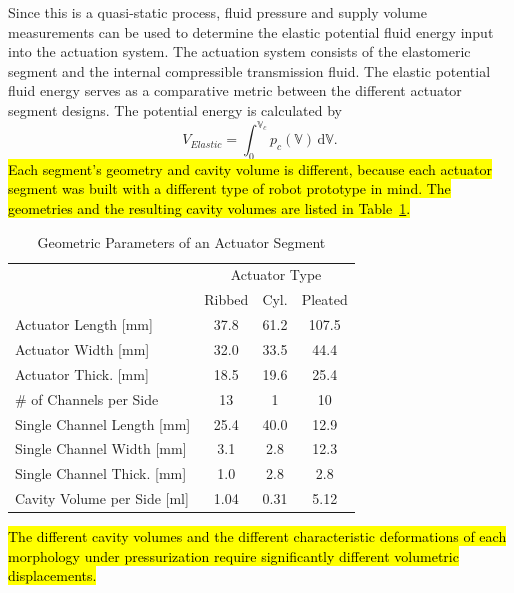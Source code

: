 Since this is a quasi-static process, fluid pressure and supply volume measurements can be used to determine the elastic potential fluid energy input into the actuation system.
%
The actuation system consists of the elastomeric segment and the internal compressible transmission fluid.
%
The elastic potential fluid energy serves as a comparative metric between the different actuator segment designs.
%
The potential energy is calculated by
\begin{equation}\label{eqn:energy}
    V_{Elastic} = \int_0^{\mathbb{V}_c} p_c\left( \mathbb{V} \right) \, \text{d} \mathbb{V}.
\end{equation}
%
\hl{Each segment's geometry and cavity volume is different, because each actuator segment was built with a different type of robot prototype in mind. The geometries and the resulting cavity volumes are listed in Table~\mbox{\ref{tab:ComparativeCharacterization}}.}
\begin{table}[htb]
\caption{Geometric Parameters of an Actuator Segment}
\centering
\begin{tabular}{l c c c}
& \multicolumn{3}{c}{Actuator Type}\\
\cline{2-4}
 & Ribbed & Cyl. & Pleated\\
\hline
Actuator Length [mm] & 37.8  & 61.2  & 107.5\\
Actuator Width [mm] & 32.0  & 33.5 & 44.4\\
Actuator Thick. [mm] & 18.5 & 19.6 & 25.4\\
\# of Channels per Side & 13 & 1 & 10\\
Single Channel Length [mm] & 25.4 & 40.0 & 12.9\\
Single Channel Width [mm] & 3.1  & 2.8 & 12.3\\
Single Channel Thick. [mm] & 1.0 & 2.8 & 2.8\\
Cavity Volume per Side [ml] & 1.04 & 0.31 & 5.12 \\
\hline
\end{tabular}
\label{tab:ComparativeCharacterization}
\end{table}
%
\hl{The different cavity volumes and the different characteristic deformations of each morphology under pressurization require significantly different volumetric displacements.}

